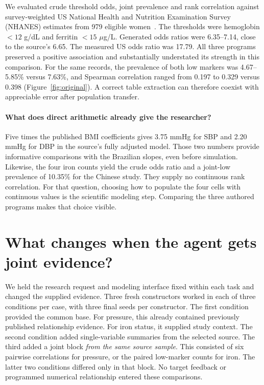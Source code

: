 \documentclass[sigconf,anonymous,review]{acmart}
\begin{document}
We evaluated crude threshold odds, joint prevalence and rank correlation against survey-weighted US National Health and Nutrition Examination Survey (NHANES) estimates from 979 eligible women~\cite{nhanes}. The thresholds were hemoglobin $<12$ g/dL and ferritin $<15$ $\mu$g/L. Generated odds ratios were 6.35--7.14, close to the source's 6.65. The measured US odds ratio was 17.79. All three programs preserved a positive association and substantially understated its strength in this comparison. For the same records, the prevalence of both low markers was 4.67--5.85\% versus 7.63\%, and Spearman correlation ranged from 0.197 to 0.329 versus 0.398 (Figure~\ref{fig:original}). A correct table extraction can therefore coexist with appreciable error after population transfer.

\paragraph{What does direct arithmetic already give the researcher?}
Five times the published BMI coefficients gives 3.75 mmHg for SBP and 2.20 mmHg for DBP in the source's fully adjusted model. Those two numbers provide informative comparisons with the Brazilian slopes, even before simulation. Likewise, the four iron counts yield the crude odds ratio and a joint-low prevalence of 10.35\% for the Chinese study. They supply no continuous rank correlation. For that question, choosing how to populate the four cells with continuous values is the scientific modeling step. Comparing the three authored programs makes that choice visible.

\section{What changes when the agent gets joint evidence?}
\label{sec:controlled}
We held the research request and modeling interface fixed within each task and changed the supplied evidence. Three fresh constructors worked in each of three conditions per case, with three final seeds per constructor. The first condition provided the common base. For pressure, this already contained previously published relationship evidence. For iron status, it supplied study context. The second condition added single-variable summaries from the selected source. The third added a joint block \emph{from the same source sample}. This consisted of six pairwise correlations for pressure, or the paired low-marker counts for iron. The latter two conditions differed only in that block. No target feedback or programmed numerical relationship entered these comparisons.
\end{document}
